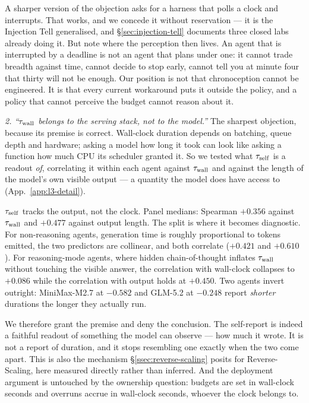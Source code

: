 A sharper version of the objection asks for a harness that polls a clock and
interrupts. That works, and we concede it without reservation --- it is the
Injection Tell generalised, and \S\ref{sec:injection-tell} documents three
closed labs already doing it. But note where the perception then lives. An
agent that is interrupted by a deadline is not an agent that plans under one:
it cannot trade breadth against time, cannot decide to stop early, cannot tell
you at minute four that thirty will not be enough. Our position is not that
chronoception cannot be engineered. It is that every current workaround puts
it outside the policy, and a policy that cannot perceive the budget cannot
reason about it.

\emph{2. ``$\tau_{\mathrm{wall}}$ belongs to the serving stack, not to the model.''} The
sharpest objection, because its premise is correct. Wall-clock duration depends
on batching, queue depth and hardware; asking a model how long it took can look
like asking a function how much CPU its scheduler granted it. So we tested what
$\tau_{\mathrm{self}}$ is a readout \emph{of}, correlating it within each agent against
$\tau_{\mathrm{wall}}$ and against the length of the model's own visible output --- a
quantity the model does have access to (App.~\ref{app:l3-detail}).

$\tau_{\mathrm{self}}$ tracks the output, not the clock. Panel medians: Spearman $+0.356$
against $\tau_{\mathrm{wall}}$ and $+0.477$ against output length. The split is where it
becomes diagnostic. For non-reasoning agents, generation time is roughly
proportional to tokens emitted, the two predictors are collinear, and both
correlate ($+0.421$ and $+0.610$). For reasoning-mode agents, where hidden
chain-of-thought inflates $\tau_{\mathrm{wall}}$ without touching the visible answer, the
correlation with wall-clock collapses to $+0.086$ while the correlation with
output holds at $+0.450$. Two agents invert outright: MiniMax-M2.7 at $-0.582$
and GLM-5.2 at $-0.248$ report \emph{shorter} durations the longer they
actually run.

We therefore grant the premise and deny the conclusion. The self-report is
indeed a faithful readout of something the model can observe --- how much it
wrote. It is not a report of duration, and it stops resembling one exactly when
the two come apart. This is also the mechanism \S\ref{ssec:reverse-scaling}
posits for Reverse-Scaling, here measured directly rather than inferred. And
the deployment argument is untouched by the ownership question: budgets are set
in wall-clock seconds and overruns accrue in wall-clock seconds, whoever the
clock belongs to.

